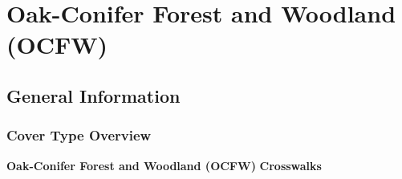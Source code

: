 \newpage
\section{Oak-Conifer Forest and Woodland (OCFW)}
\label{ocfw-description}

\subsection*{General Information}

\subsubsection{Cover Type Overview}

\textbf{Oak-Conifer Forest and Woodland (OCFW)}
\newline
\textbf{Crosswalks}
